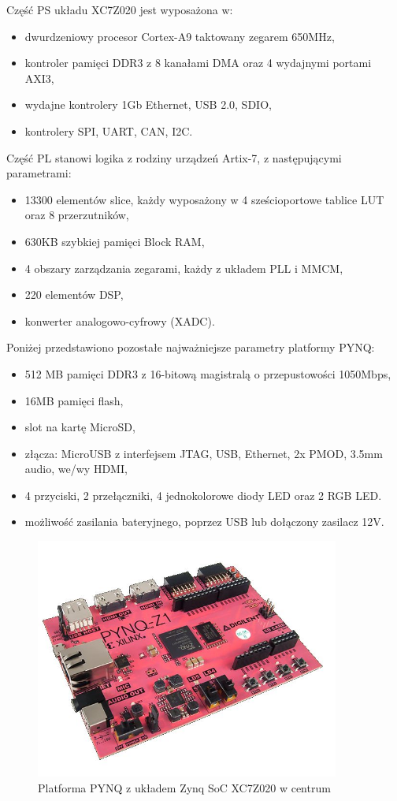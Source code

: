 Część PS układu XC7Z020 jest wyposażona w:
\begin{itemize}
	\item dwurdzeniowy procesor Cortex-A9 taktowany zegarem 650MHz,
	\item kontroler pamięci DDR3 z 8 kanałami DMA oraz 4 wydajnymi portami AXI3,
	\item wydajne kontrolery 1Gb Ethernet, USB 2.0, SDIO,
	\item kontrolery SPI, UART, CAN, I2C.
\end{itemize}
Część PL stanowi logika z rodziny urządzeń Artix-7, z następującymi parametrami:
\begin{itemize}
	\item 13300 elementów slice, każdy wyposażony w 4 sześcioportowe tablice LUT oraz 8 przerzutników,
	\item 630KB szybkiej pamięci Block RAM,
	\item 4 obszary zarządzania zegarami, każdy z układem PLL i MMCM,
	\item 220 elementów DSP,
	\item konwerter analogowo-cyfrowy (XADC).
\end{itemize}

Poniżej przedstawiono pozostałe najważniejsze parametry platformy PYNQ:
\begin{itemize}
	\item 512 MB pamięci DDR3 z 16-bitową magistralą o przepustowości 1050Mbps,
	\item 16MB pamięci flash,
	\item slot na kartę MicroSD,
	\item złącza: MicroUSB z interfejsem JTAG, USB, Ethernet, 2x PMOD, 3.5mm audio, we/wy HDMI,
	\item 4 przyciski, 2 przełączniki, 4 jednokolorowe diody LED oraz 2 RGB LED.
	\item możliwość zasilania bateryjnego, poprzez USB lub dołączony zasilacz 12V.
\end{itemize}

\begin{figure}[h]
	\centering
	\includegraphics[width=10cm]{4_PYNQ.jpg}
	\caption{Platforma PYNQ z układem Zynq SoC XC7Z020 w centrum}
	\label{fig:PYNQ}
\end{figure}

